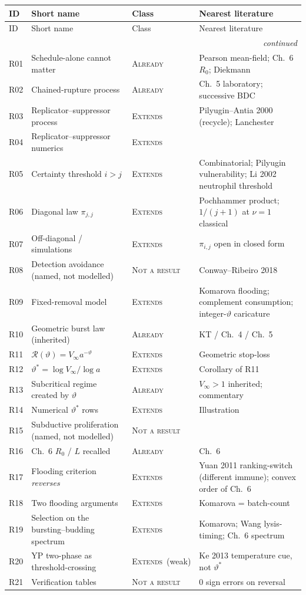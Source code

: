 \documentclass[11pt,a4paper]{report}
\newcommand{\cls}[1]{\textsc{#1}}
\newcommand{\ext}{\cls{Extends}}
\newcommand{\alr}{\cls{Already}}
\newcommand{\nar}{\cls{Not a result}}
\newcommand{\itemhead}{%
  \toprule
  ID & Short name & Class & Nearest literature \\
  \midrule
  \endfirsthead
  \toprule
  ID & Short name & Class & Nearest literature \\
  \midrule
  \endhead
  \midrule
  \multicolumn{4}{r}{\footnotesize\itshape continued} \\
  \endfoot
  \bottomrule
  \endlastfoot
}
\newcommand{\itemtable}{\begin{longtable}{L{1.55cm}L{4.35cm}L{2.35cm}L{6.55cm}}}
\begin{document}
\itemtable
\itemhead
R01 & Schedule-alone cannot matter & \alr &
Pearson mean-field; Ch.~6 \(R_0\); Diekmann \\
R02 & Chained-rupture process & \alr & Ch.~5 laboratory; successive BDC \\
R03 & Replicator--suppressor process & \ext &
Pilyugin--Antia 2000 (recycle); Lanchester \\
R04 & Replicator--suppressor numerics & \ext & \\
R05 & Certainty threshold \(i>j\) & \ext &
Combinatorial; Pilyugin vulnerability; Li 2002 neutrophil threshold \\
R06 & Diagonal law \(\pi_{j,j}\) & \ext &
Pochhammer product; \(1/(j+1)\) at \(\nu=1\) classical \\
R07 & Off-diagonal / simulations & \ext & \(\pi_{i,j}\) open in closed form \\
R08 & Detection avoidance (named, not modelled) & \nar &
Conway--Ribeiro 2018 \\
R09 & Fixed-removal model & \ext &
Komarova flooding; complement consumption; integer-\(\vartheta\)
caricature \\
R10 & Geometric burst law (inherited) & \alr & KT / Ch.~4 / Ch.~5 \\
R11 & \(\mathcal{R}(\vartheta)=V_\infty a^{-\vartheta}\) & \ext &
Geometric stop-loss \\
R12 & \(\vartheta^\ast=\log V_\infty/\log a\) & \ext & Corollary of R11 \\
R13 & Subcritical regime created by \(\vartheta\) & \alr &
\(V_\infty>1\) inherited; commentary \\
R14 & Numerical \(\vartheta^\ast\) rows & \ext & Illustration \\
R15 & Subductive proliferation (named, not modelled) & \nar & \\
R16 & Ch.~6 \(R_0\) / \(L\) recalled & \alr & Ch.~6 \\
R17 & Flooding criterion \emph{reverses} & \ext &
Yuan 2011 ranking-switch (different immune); convex order of Ch.~6 \\
R18 & Two flooding arguments & \ext & Komarova = batch-count \\
R19 & Selection on the bursting--budding spectrum & \ext &
Komarova; Wang lysis-timing; Ch.~6 spectrum \\
R20 & YP two-phase as threshold-crossing & \ext\ (weak) &
Ke 2013 temperature cue, not \(\vartheta^\ast\) \\
R21 & Verification tables & \nar & 0 sign errors on reversal \\
\end{longtable}
\end{document}

